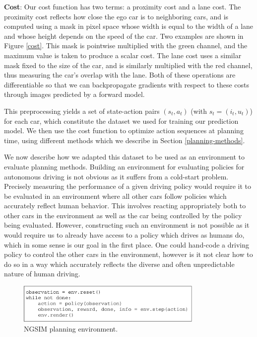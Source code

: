 \documentclass{article} %
\begin{document}
\textbf{Cost}: Our cost function has two terms: a proximity cost and a lane cost. The proximity cost reflects how close the ego car is to neighboring cars, and is computed using a mask in pixel space whose width is equal to the width of a lane and whose height depends on the speed of the car. Two examples are shown in Figure \ref{cost}.
This mask is pointwise multiplied with the green channel, and the maximum value is taken to produce a scalar cost.
The lane cost uses a similar mask fixed to the size of the car, and is similarly multiplied with the red channel, thus measuring the car's overlap with the lane.
Both of these operations are differentiable so that we can backpropagate gradients with respect to these costs through images predicted by a forward model.

This preprocessing yields a set of state-action pairs $(s_t, a_t)$ (with $s_t=(i_t, u_t)$) for each car, which constitute the dataset we used for training our prediction model.
We then use the cost function to optimize action sequences at planning time, using different methods which we describe in Section \ref{planning-methods}.

We now describe how we adapted this dataset to be used as an environment to evaluate planning methods.
Building an environment for evaluating policies for autonomous driving is not obvious as it suffers from a cold-start problem.
Precisely measuring the performance of a given driving policy would require it to be evaluated in an environment where all other cars follow policies which accurately reflect human behavior.
This involves reacting appropriately both to other cars in the environment as well as the car being controlled by the policy being evaluated.
However, constructing such an environment is not possible as it would require us to already have access to a policy which drives as humans do, which in some sense is our goal in the first place. One could hand-code a driving policy to control the other cars in the environment, however is it not clear how to do so in a way which accurately reflects the diverse and often unpredictable nature of human driving.

\begin{figure}
  \centering
  \includegraphics[width=0.8\textwidth]{figures/driving/traffic_gym_code-crop.pdf}
  \caption{NGSIM planning environment.}
\label{interface}
\end{figure}
\end{document}
